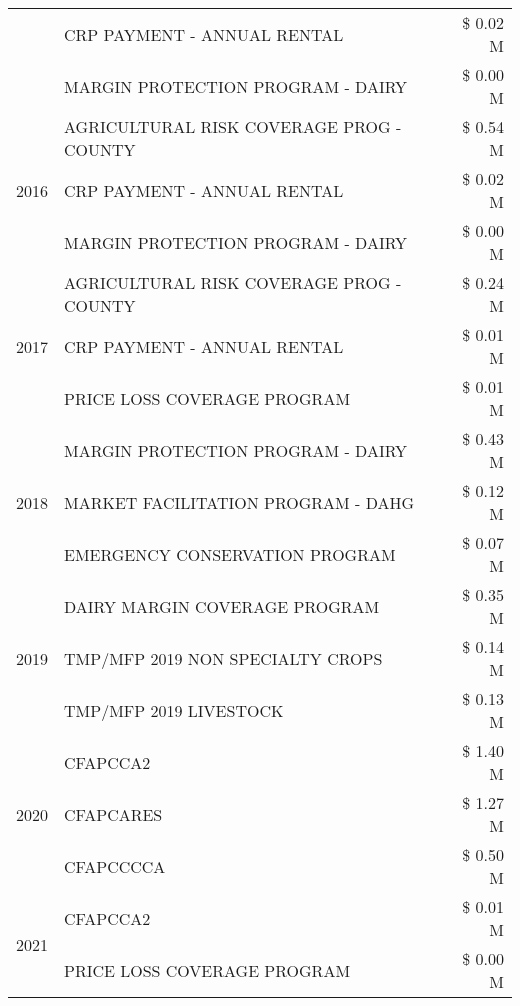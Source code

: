 \begin{tabular}{llr}
 & CRP PAYMENT - ANNUAL RENTAL & \$ 0.02 M \\
 & MARGIN PROTECTION PROGRAM - DAIRY & \$ 0.00 M \\
\cline{1-3}
\multirow[t]{3}{*}{2016} & AGRICULTURAL RISK COVERAGE PROG - COUNTY & \$ 0.54 M \\
 & CRP PAYMENT - ANNUAL RENTAL & \$ 0.02 M \\
 & MARGIN PROTECTION PROGRAM - DAIRY & \$ 0.00 M \\
\cline{1-3}
\multirow[t]{3}{*}{2017} & AGRICULTURAL RISK COVERAGE PROG - COUNTY & \$ 0.24 M \\
 & CRP PAYMENT - ANNUAL RENTAL & \$ 0.01 M \\
 & PRICE LOSS COVERAGE PROGRAM & \$ 0.01 M \\
\cline{1-3}
\multirow[t]{3}{*}{2018} & MARGIN PROTECTION PROGRAM - DAIRY & \$ 0.43 M \\
 & MARKET FACILITATION PROGRAM - DAHG & \$ 0.12 M \\
 & EMERGENCY CONSERVATION PROGRAM & \$ 0.07 M \\
\cline{1-3}
\multirow[t]{3}{*}{2019} & DAIRY MARGIN COVERAGE PROGRAM & \$ 0.35 M \\
 & TMP/MFP 2019 NON SPECIALTY CROPS & \$ 0.14 M \\
 & TMP/MFP 2019 LIVESTOCK & \$ 0.13 M \\
\cline{1-3}
\multirow[t]{3}{*}{2020} & CFAPCCA2 & \$ 1.40 M \\
 & CFAPCARES & \$ 1.27 M \\
 & CFAPCCCCA & \$ 0.50 M \\
\cline{1-3}
\multirow[t]{2}{*}{2021} & CFAPCCA2 & \$ 0.01 M \\
 & PRICE LOSS COVERAGE PROGRAM & \$ 0.00 M \\
\cline{1-3}
\bottomrule
\end{tabular}
